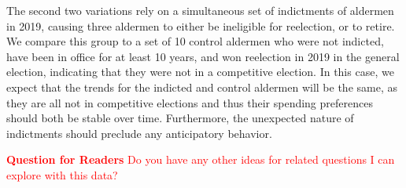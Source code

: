 The second two variations rely on a simultaneous set of indictments of aldermen in 2019, causing three aldermen to either be ineligible for reelection, or to retire. 
We compare this group to a set of 10 control aldermen who were not indicted, have been in office for at least 10 years, and won reelection in 2019 in the general election, indicating that they were not in a competitive election. 
In this case, we expect that the trends for the indicted and control aldermen will be the same, as they are all not in competitive elections and thus their spending preferences should both be stable over time.
Furthermore, the unexpected nature of indictments should preclude any anticipatory behavior.

\textcolor{red}{\textbf{Question for Readers} Do you have any other ideas for related questions I can explore with this data?}

